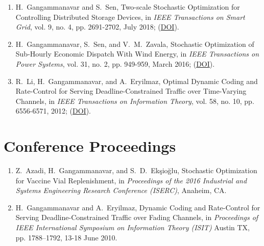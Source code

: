 \documentclass[hyperref, margin]{myResume}
\begin{document}
\begin{resume}
\begin{enumerate}[label=J\arabic*., leftmargin=*]
	\item H.\ Gangammanavar and S.\ Sen, Two-scale Stochastic Optimization for Controlling Distributed Storage Devices, in \textit{IEEE Transactions on Smart Grid}, vol. 9, no. 4, pp. 2691-2702, July 2018; (\href{https://doi.org/10.1109/TSG.2016.2616881}{DOI}).

	\item H.\ Gangammanavar, S.\ Sen, and V.\ M.\ Zavala, Stochastic Optimization of Sub-Hourly Economic Dispatch With Wind Energy, in \textit{IEEE Transactions on Power Systems}, vol. 31, no. 2, pp. 949-959, March 2016; (\href{https://doi.org/10.1109/TPWRS.2015.2410301}{DOI}).
	
	\item R.\ Li, H.\ Gangammanavar, and A.\ Eryilmaz, Optimal Dynamic Coding and Rate-Control for Serving Deadline-Constrained Traffic over Time-Varying Channels, in \textit{IEEE Transactions on Information Theory}, vol. 58, no. 10, pp. 6556-6571, 2012; (\href{https://doi.org/10.1109/TIT.2012.2204031}{DOI}).
\end{enumerate}

\section{Conference Proceedings}
\begin{enumerate}[label=C\arabic*., leftmargin=*]
	\item  Z.\ Azadi\footnotemark[3], H.\ Gangammanavar, and S.\ D.\ Ek{\c{s}}io{\u{g}}lu, Stochastic Optimization for Vaccine Vial Replenishment, in \textit{Proceedings of the 2016 Industrial and Systems Engineering Research Conference (ISERC)}, Anaheim, CA.
	\item H.\ Gangammanavar and A.\ Eryilmaz, Dynamic Coding and Rate-Control for Serving Deadline-Constrained Traffic over Fading Channels, in \textit{Proceedings of IEEE International Symposium on Information Theory (ISIT)} Austin TX, pp. 1788--1792, 13-18 June 2010.
\end{enumerate}


\end{resume}
\end{document}
